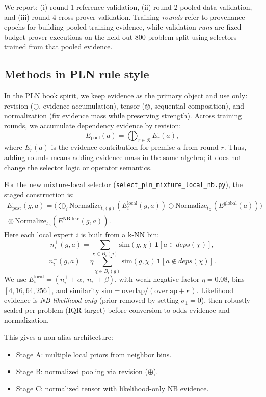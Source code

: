 \documentclass[11pt]{article}
\newcommand{\lpath}[1]{\texttt{\nolinkurl{#1}}}
\begin{document}
\noindent
We report: (i) round-1 reference validation, (ii) round-2 pooled-data
validation, and (iii) round-4 cross-prover validation.
Training \emph{rounds} refer to provenance epochs for building pooled training
evidence, while validation \emph{runs} are fixed-budget prover executions on the
held-out 800-problem split using selectors trained from that pooled evidence.

\subsection{Methods in PLN rule style}
In the PLN book spirit, we keep evidence as the primary object and use only:
revision (\(\oplus\), evidence accumulation), tensor (\(\otimes\), sequential
composition), and normalization (fix evidence mass while preserving strength).
Across training rounds, we accumulate dependency evidence by revision:
\[
  E_{\mathrm{pool}}(a)=\bigoplus_{r\in\mathcal{R}} E_r(a),
\]
where \(E_r(a)\) is the evidence contribution for premise \(a\) from round \(r\).
Thus, adding rounds means adding evidence mass in the same algebra; it does not
change the selector logic or operator semantics.

For the new mixture-local selector (\lpath{select_pln_mixture_local_nb.py}),
the staged construction is:
\begin{multline*}
  E_{\text{post}}(g,a) =
  \Big(
    \bigoplus_i \mathrm{Normalize}_{t_i(g)}(E_i^{\text{local}}(g,a))
    \oplus \mathrm{Normalize}_{t_G}(E^{\text{global}}(a))
  \Big)\\
  {}\otimes
  \mathrm{Normalize}_{t_L}(E^{\text{NB-like}}(g,a)).
\end{multline*}
Here each local expert \(i\) is built from a k-NN bin:
\[
  n_i^+(g,a)=\sum_{\chi\in B_i(g)} \mathrm{sim}(g,\chi)\,\mathbf{1}[a\in deps(\chi)],
\]
\[
  n_i^-(g,a)=\eta\sum_{\chi\in B_i(g)} \mathrm{sim}(g,\chi)\,\mathbf{1}[a\notin deps(\chi)].
\]
We use \(E_i^{\text{local}}=(n_i^++\alpha,\;n_i^-+\beta)\), with weak-negative
factor \(\eta=0.08\), bins \([4,16,64,256]\), and similarity
\(\mathrm{sim}=\mathrm{overlap}/(\mathrm{overlap}+\kappa)\).
Likelihood evidence is \emph{NB-likelihood only} (prior removed by setting
\(\sigma_1=0\)), then robustly scaled per problem (IQR target) before conversion
to odds evidence and normalization.

This gives a non-alias architecture:
\begin{itemize}
\item Stage A: multiple local priors from neighbor bins.
\item Stage B: normalized pooling via revision (\(\oplus\)).
\item Stage C: normalized tensor with likelihood-only NB evidence.
\end{itemize}
\end{document}
